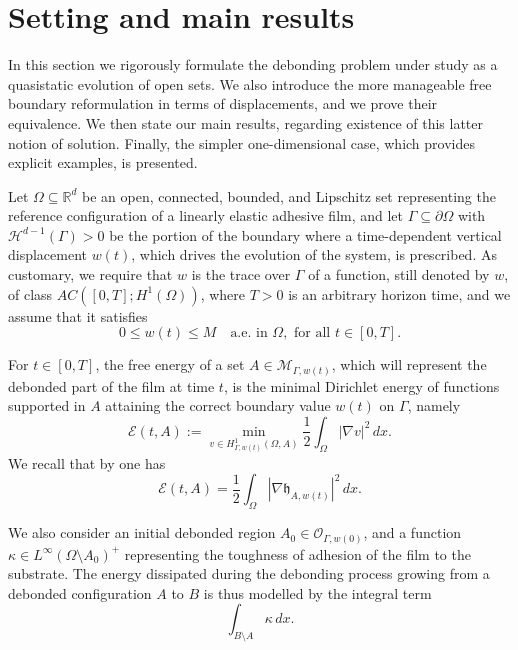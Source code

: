 \documentclass[a4paper,11pt,reqno]{amsart}
\numberwithin{equation}{section}
\theoremstyle{definition}
\theoremstyle{remark}
\renewcommand{\r}{\mathbb{R}}
\begin{document}
\section{Setting and main results}\label{sec:setting}

In this section we rigorously formulate the debonding problem under study as a quasistatic evolution of open sets. We also introduce the more manageable free boundary reformulation in terms of displacements, and we prove their equivalence. We then state our main results, regarding existence of this latter notion of solution. Finally, the simpler one-dimensional case, which provides explicit examples, is presented.

Let $\Omega \subseteq \r^d$ be an open, connected, bounded, and Lipschitz set representing the reference configuration of a linearly elastic adhesive film, and let $\Gamma \subseteq \partial \Omega$ with $\mathcal{H}^{d-1}(\Gamma) > 0$ be the portion of the boundary where a time-dependent vertical displacement $w(t)$, which drives the evolution of the system, is prescribed. As customary, we require that $w$ is the trace over $\Gamma$ of a function, still denoted by $w$,  of class $ AC([0,T];H^1(\Omega))$, where $T>0$ is an arbitrary horizon time, and we assume that it satisfies
\begin{equation}\label{eq:boundednessw}
    0\le w(t)\le M\quad\text{a.e. in }\Omega,\text{ for all }t\in [0,T].
\end{equation}

For $t\in [0,T]$, the free energy of a set $A\in \mathcal M_{\Gamma,w(t)}$, which will represent the debonded part of the film at time $t$, is the minimal Dirichlet energy of functions supported in $A$ attaining the correct boundary value $w(t)$ on $\Gamma$, namely
\begin{equation}
    \mathcal E(t,A):=\min\limits_{v \in H^1_{\Gamma,w(t)}(\Omega,A)}\frac 12 \int_\Omega|\nabla v|^2 \,dx.
\end{equation}
We recall that by  one has 
\begin{equation}\label{eq:energy}
    \mathcal E(t,A)=\frac 12 \int_\Omega|\nabla \mathfrak{h}_{A,w(t)}|^2 \,dx.
\end{equation}


We also consider an initial debonded region $A_0\in \mathcal O_{\Gamma,w(0)}$, and a function $\kappa\in L^\infty(\Omega\setminus A_0)^+$ representing the toughness of adhesion of the film to the substrate. The energy dissipated during the debonding process growing from a debonded configuration $A$ to $B$ is thus modelled by the integral term
\begin{equation}
    \int_{B\setminus A}\kappa\, dx.
\end{equation}
\end{document}
